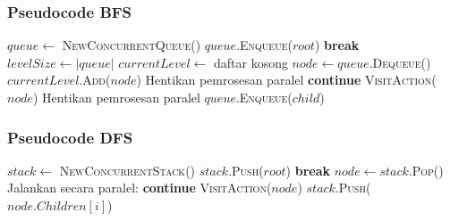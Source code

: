 \documentclass[12pt]{article}
\begin{document}
\subsubsection{Pseudocode BFS}
\begin{algorithm}[H]
\caption{BFS dengan Paralelisasi per Level pada Pohon DOM}
\label{alg:bfs}
\begin{algorithmic}[1]
    \State $queue \gets$ \textsc{NewConcurrentQueue}()
    \State $queue$.\textsc{Enqueue}($root$)
            \State \textbf{break}
        \EndIf
        \State $levelSize \gets |queue|$
        \State $currentLevel \gets$ daftar kosong
            \State $node \gets queue$.\textsc{Dequeue}()
            \State $currentLevel$.\textsc{Add}($node$)
        \EndFor
         
                \State Hentikan pemrosesan paralel
                \State \textbf{continue}
            \EndIf
            \State \textsc{VisitAction}($node$) 
                \State Hentikan pemrosesan paralel
            \EndIf
                \State $queue$.\textsc{Enqueue}($child$)
            \EndFor
        \EndFor
    \EndWhile
\EndProcedure
\end{algorithmic}
\end{algorithm}

\subsubsection{Pseudocode DFS}

\begin{algorithm}[H]
\caption{DFS Iteratif dengan Stack pada Pohon DOM}
\label{alg:dfs}
\begin{algorithmic}[1]
    \State $stack \gets$ \textsc{NewConcurrentStack}()
    \State $stack$.\textsc{Push}($root$)
            \State \textbf{break}
        \EndIf
        \State $node \gets stack$.\textsc{Pop}()
        \State Jalankan secara paralel: 
            \State \textbf{continue}
        \EndIf
        \State \textsc{VisitAction}($node$) 
             
                \State $stack$.\textsc{Push}($node.Children[i]$)
            \EndFor
        \EndIf
    \EndWhile
\EndProcedure
\end{algorithmic}
\end{algorithm}
\end{document}
